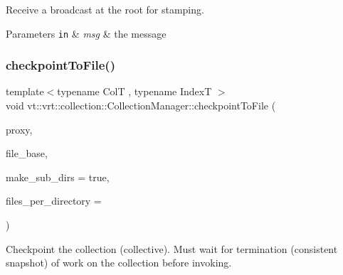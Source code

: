 Receive a broadcast at the root for stamping. 


\begin{DoxyParams}[1]{Parameters}
\mbox{\tt in}  & {\em msg} & the message \\
\hline
\end{DoxyParams}
\mbox{\label{structvt_1_1vrt_1_1collection_1_1_collection_manager_af3771d408c2ef15e65b9ba8219aa830a}} 
\subsubsection{\texorpdfstring{checkpoint\+To\+File()}{checkpointToFile()}}
{\footnotesize\ttfamily template$<$typename ColT , typename IndexT $>$ \\
void vt\+::vrt\+::collection\+::\+Collection\+Manager\+::checkpoint\+To\+File (\begin{DoxyParamCaption}\item[{\hyperlink{structvt_1_1vrt_1_1collection_1_1_collection_manager_a56458ed7f9bb22b631b9b3a745f42f94}{Collection\+Proxy\+Wrap\+Type}$<$ ColT $>$}]{proxy,  }\item[{std\+::string const \&}]{file\+\_\+base,  }\item[{bool}]{make\+\_\+sub\+\_\+dirs = {\ttfamily true},  }\item[{int}]{files\+\_\+per\+\_\+directory = {} }\end{DoxyParamCaption})}



Checkpoint the collection (collective). Must wait for termination (consistent snapshot) of work on the collection before invoking. 


